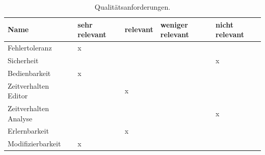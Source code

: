 \documentclass[a4paper]{scrreprt}
\begin{document}
\begin{table}[H]
  \centering
  \begin{tabular}{|P{3cm}|P{2cm}|P{2cm}|P{2cm}|P{2cm}|}
    Name & sehr relevant & relevant & weniger relevant & nicht relevant\\ \hline
    Fehlertoleranz & x &  &  &  \\ \hline
    Sicherheit &  &  &  & x \\ \hline
    Bedienbarkeit & x &  &  &  \\ \hline
  	Zeitverhalten Editor &  & x &  &  \\ \hline
  	Zeitverhalten Analyse &  &  &  & x \\ \hline
  	Erlernbarkeit &  & x &  &  \\ \hline 
    Modifizierbarkeit & x &  &  &  \\
  \end{tabular}
  \newline\newline
  \caption{Qualitätsanforderungen.}\label{qa}
\end{table}


\printglossaries
 

 
\end{document}

